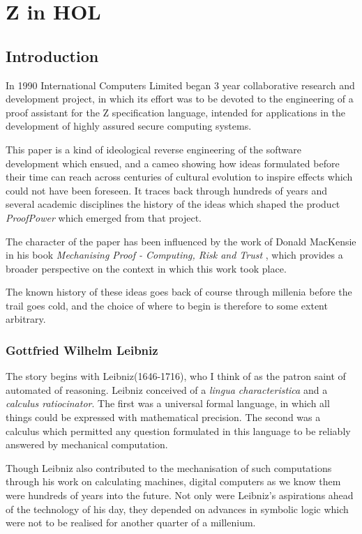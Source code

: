 \documentclass[10pt,titlepage]{book}
\begin{document}
\chapter{Z in HOL}

\section{Introduction}

In 1990 International Computers Limited began 3 year collaborative research and development project, in which its effort was to be devoted to the engineering of a proof assistant for the Z specification language, intended for applications in the development of highly assured secure computing systems.

This paper is a kind of ideological reverse engineering of the software development which ensued, and a cameo showing how ideas formulated before their time can reach across centuries of cultural evolution to inspire effects which could not have been foreseen.
It traces back through hundreds of years and several academic disciplines the history of the ideas which shaped the product {\it ProofPower} which emerged from that project.

The character of the paper has been influenced by the work of Donald MacKensie in his book {\it Mechanising Proof - Computing, Risk and Trust} \cite{mackensie}, which provides a broader perspective on the context in which this work took place.

The known history of these ideas goes back of course through millenia before the trail goes cold, and the choice of where to begin is therefore to some extent arbitrary.

\subsection{Gottfried Wilhelm Leibniz}

The story begins with Leibniz(1646-1716), who I think of as the patron saint of automated of reasoning.
Leibniz conceived of a {\it lingua characteristica} and a {\it calculus ratiocinator}.
The first was a universal formal language, in which all things could be expressed with mathematical precision.
The second was a calculus which permitted any question formulated in this language to be reliably answered by mechanical computation.

Though Leibniz also contributed to the mechanisation of such computations through his work on calculating machines, digital computers as we know them were hundreds of years into the future.
Not only were Leibniz's aspirations ahead of the technology of his day, they depended on advances in symbolic logic which were not to be realised for another quarter of a millenium.
\end{document}
